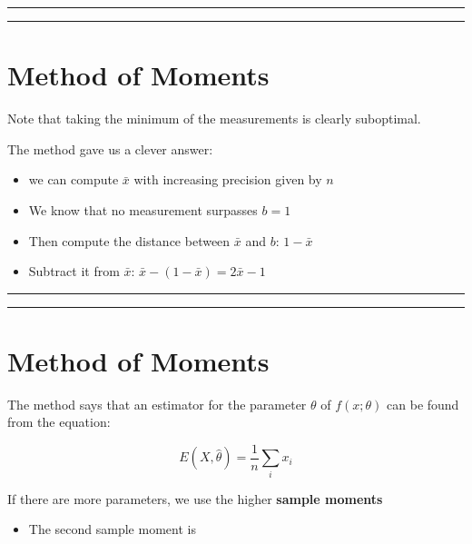 \documentclass[
]{book}
\providecommand{\tightlist}{%
  \setlength{\itemsep}{0pt}\setlength{\parskip}{0pt}}
\begin{document}
\begin{center}\rule{0.5\linewidth}{0.5pt}\end{center}

\begin{center}\rule{0.5\linewidth}{0.5pt}\end{center}

\hypertarget{method-of-moments-5}{%
\section{Method of Moments}\label{method-of-moments-5}}

Note that taking the minimum of the measurements is clearly suboptimal.

The method gave us a clever answer:

\begin{itemize}
\tightlist
\item
  we can compute \(\bar{x}\) with increasing precision given by \(n\)
\item
  We know that no measurement surpasses \(b=1\)
\item
  Then compute the distance between \(\bar{x}\) and \(b\): \(1-\bar{x}\)
\item
  Subtract it from \(\bar{x}\): \(\bar{x}-(1-\bar{x})=2\bar{x}-1\)
\end{itemize}

\begin{center}\rule{0.5\linewidth}{0.5pt}\end{center}

\begin{center}\rule{0.5\linewidth}{0.5pt}\end{center}

\hypertarget{method-of-moments-6}{%
\section{Method of Moments}\label{method-of-moments-6}}

The method says that an estimator for the parameter \(\theta\) of \(f(x;\theta)\) can be found from the equation:

\[E(X, \hat{\theta})=\frac{1}{n}\sum_i x_i\]

If there are more parameters, we use the higher \textbf{sample moments}

\begin{itemize}
\tightlist
\item
  The second sample moment is
\end{itemize}
\end{document}
